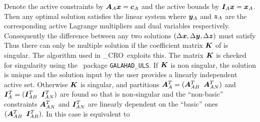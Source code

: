 \documentclass{galahad}
\newcommand{\packagename}{CRO}
\newcommand{\fullpackagename}{\libraryname\_\packagename}
\begin{document}
Denote the active constraints by ${\bm{A}}_A {\bm{x}} = {\bm{c}}_A$ and the
active bounds by ${\bm{I}}_A {\bm{x}} = {\bm{x}}_A$. Then any optimal solution satisfies
the linear system
where ${\bm{y}}_A$ and ${\bm{z}}_A$ are the corresponding active Lagrange multipliers
and dual variables respectively. Consequently the difference between
any two solutions $(\Delta {\bm{x}}, \Delta {\bm{y}}, \Delta {\bm{z}})$ must satisfy
Thus there can only be multiple solution if the coefficient matrix ${\bm{K}}$
of  is singular. The algorithm used in \fullpackagename\
exploits this. The matrix ${\bm{K}}$ is checked for singularity
using the \galahad\ package {\tt GALAHAD\_ULS}. If ${\bm{K}}$ is
non singular, the solution is unique and the solution input by the user
provides a linearly independent active set. Otherwise ${\bm{K}}$ is singular,
and partitions ${\bm{A}}_A^T = ( {\bm{A}}_{AB}^T \;\; {\bm{A}}_{AN}^T)$ and
${\bm{I}}_A^T = ( {\bm{I}}_{AB}^T \;\; {\bm{I}}_{AN}^T)$ are found so that
\disp{
 \mat{ccc}{\bmH & - \bmA_{AB}^T & - \bmI^T_{AB} \\ \bmA_{AB} & 0 & 0 \\
 \bmI_{AB} & 0 & 0 }}
is non-singular and the ``non-basic'' constraints ${\bm{A}}_{AN}^T$
and ${\bm{I}}_{AN}^T$ are linearly dependent on the ``basic'' ones
$( {\bm{A}}_{AB}^T \;\; {\bm{I}}_{AB}^T)$. In this case  is equivalent to
\end{document}
